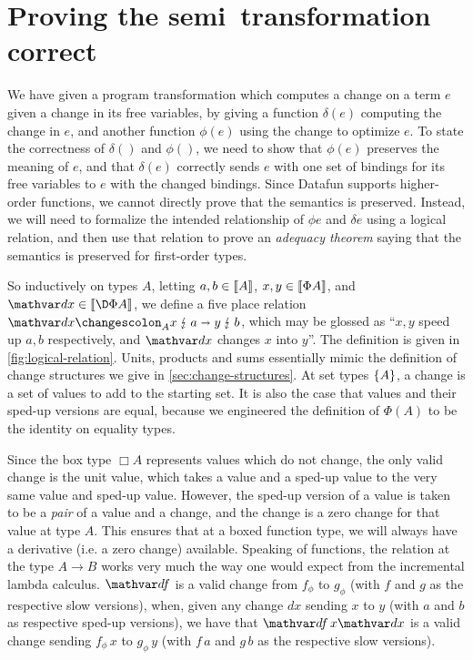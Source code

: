 \section{Proving the semi\naive\ transformation correct}

We have given a program transformation which computes a change on a
term $e$ given a change in its free variables, by giving a function
$\delta(e)$ computing the change in $e$, and another function
$\phi(e)$ using the change to optimize $e$. To state the correctness
of $\delta()$ and $\phi()$, we need to show that $\phi(e)$ preserves
the meaning of $e$, and that
$\delta(e)$ correctly sends $e$ with one set of bindings for its free
variables to $e$ with the changed bindings.
%
Since Datafun supports higher-order functions, we cannot directly
prove that the semantics is preserved. Instead, we will need to
formalize the intended relationship of $\phi e$ and $\delta e$ using a
logical relation, and then use that relation to prove an
\emph{adequacy theorem} saying that the semantics is preserved for
first-order types.

So inductively on types $A$, letting $a,b \in \llbracket{A}\rrbracket$,
$x,y \in \llbracket{\Phi A}\rrbracket$, and $\dx \in \den{\DP A}$, we define a five
place relation $\weirdat{A}{\dx}{x}{a}{y}{b}$, which may be glossed as
``$x,y$ speed up $a,b$ respectively, and $\dx$ changes $x$ into $y$''.
The definition is given in \cref{fig:logical-relation}. Units,
products and sums essentially mimic the definition of change
structures we give in \cref{sec:change-structures}. At set types
$\{{A}\}$, a change is a set of values to add to the
starting set. It is also the case that values and their
sped-up versions are equal, because we engineered the definition of
$\Phi(A)$ to be the identity on equality types.

Since the box type $\Box A$ represents values which do not change, the
only valid change is the unit value, which takes a value and a sped-up
value to the very same value and sped-up value. However, the sped-up
version of a value is taken to be a \emph{pair} of a value and a
change, and the change is a zero change for that value at type $A$.
This ensures that at a boxed function type, we will always have a
derivative (i.e. a zero change) available.
%
Speaking of functions, the relation at the type $A \to B$ works very
much the way one would expect from the incremental lambda calculus.
$\df$ is a valid change from $f_\phi$ to $g_\phi$ (with $f$ and $g$ as the
respective slow versions), when, given any
change $dx$ sending $x$ to $y$ (with $a$ and $b$ as respective sped-up
versions), we have that $\df\,x\dx$ is a valid change sending
$f_\phi\,x$ to $g_\phi\,y$ (with $f\,a$ and $g\,b$ as the respective
slow versions).

